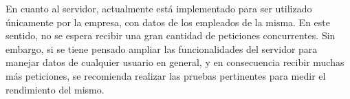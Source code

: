 En cuanto al servidor, actualmente está implementado para ser utilizado únicamente por la empresa, con datos de los empleados de la misma. En este sentido, no se espera recibir una gran cantidad de peticiones concurrentes. Sin embargo, si se tiene pensado ampliar las funcionalidades del servidor para manejar datos de cualquier usuario en general, y en consecuencia recibir muchas más peticiones, se recomienda realizar las pruebas pertinentes para medir el rendimiento del mismo.


